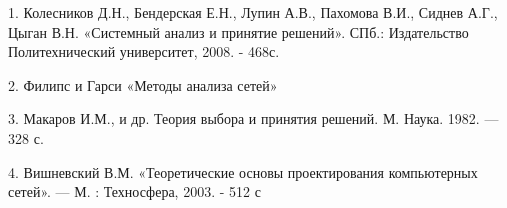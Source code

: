 \documentclass[a4paper, 12pt]{article}		%
\begin{document}
1.	Колесников Д.Н., Бендерская Е.Н., Лупин А.В., Пахомова В.И., Сиднев А.Г., Цыган В.Н. «Системный анализ и принятие решений». СПб.: Издательство Политехнический университет, 2008. - 468с.

2.  Филипс и Гарси «Методы анализа сетей»

3.	Макаров И.М., и др. Теория выбора и принятия решений. М. Наука. 1982. — 328 с.

4.	Вишневский В.М. «Теоретические основы проектирования компьютерных сетей». — М. : Техносфера, 2003. - 512 с

\end{document}
